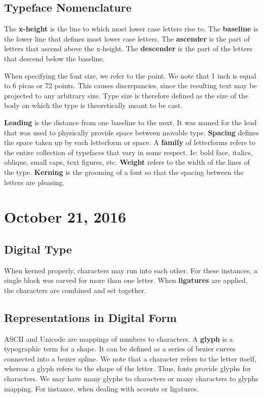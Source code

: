 \documentclass[11pt]{article}
\theoremstyle{plain} %
\theoremstyle{definition}
\theoremstyle{example}
\theoremstyle{remark}
\begin{document}
\subsection{Typeface Nomenclature}

The \textbf{x-height} is the line to which most lower case letters rise to. The \textbf{baseline} is the lower line that defines most lower case letters. The \textbf{ascender} is the part of letters that ascend above the x-height. The \textbf{descender} is the part of the letters that descend below the baseline. 

When specifying the font size, we refer to the point. We note that 1 inch is equal to 6 picas or 72 points. This causes discrepancies, since the resulting text may be projected to any arbitrary size. Type size is therefore defined as the size of the body on which the type is theoretically meant to be cast. 

\textbf{Leading} is the distance from one baseline to the next. It was named for the lead that was used to physically provide space between movable type. \textbf{Spacing} defines the space taken up by each letterform or space. A \textbf{family} of letterforms refers to the entire collection of typefaces that vary in some respect. Ie: bold face, italics, oblique, small caps, text figures, etc. \textbf{Weight} refers to the width of the lines of the type. \textbf{Kerning} is the grooming of a font so that the spacing between the letters are pleasing. 



\section{October 21, 2016}
\subsection{Digital Type}

When kerned properly, characters may run into each other. For these instances, a single block was carved for more than one letter. When \textbf{ligatures} are applied, the characters are combined and set together. 

\subsection{Representations in Digital Form}

ASCII and Unicode are mappings of numbers to characters. A \textbf{glyph} is a typographic term for a shape. It can be defined as a series of bezier curves connected into a bezier spline. We note that a character refers to the letter itself, whereas a glyph refers to the shape of the letter. Thus, fonts provide glyphs for characters. We may have many glyphs to characters or many characters to glyphs mapping. For instance, when dealing with accents or ligatures. 
\end{document}
